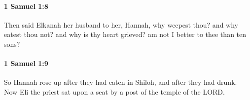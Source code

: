 		\paragraph{1 Samuel 1:8} %
			\label{1SAMUEL-1-8}

			Then said Elkanah her husband to her, Hannah, why weepest thou? and why eatest thou not? and why is thy heart grieved? am not I better to thee than ten sons?


		\paragraph{1 Samuel 1:9} %
			\label{1SAMUEL-1-9}

			So Hannah rose up after they had eaten in Shiloh, and after they had drunk. Now Eli the priest sat upon a seat by a post of the temple of the LORD.


